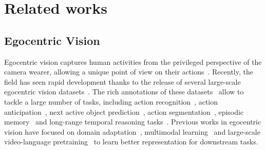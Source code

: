 \section{Related works}\label{sec:related_works}

\subsection{Egocentric Vision}
Egocentric vision captures human activities from the privileged perspective of the camera wearer, allowing a unique point of view on their actions~\cite{betancourt2015evolution,plizzari2024outlook}.
Recently, the field has seen rapid development thanks to the release of several large-scale egocentric vision datasets~\cite{ek55,egtea,epic_tent,ek100,ego4d,sener2022assembly101}.
The rich annotations of these datasets~\cite{ek100,ego4d} allow to tackle a large number of tasks, including action recognition~\cite{nunez2022egocentric}, action anticipation~\cite{furnari2020rulstm,girdhar2021anticipative,zhong2023anticipative}, next active object prediction~\cite{furnari2017next}, action segmentation~\cite{zhang2022actionformer,huang2020improving}, episodic memory~\cite{ramakrishnan2023spotem} and long-range temporal reasoning tasks~\cite{goletto2025amego,mangalam2023egoschema,jia2022egotaskqa}.
Previous works in egocentric vision have focused on domain adaptation~\cite{Munro_2020_CVPR,yang2022interact,chen2019temporal,plizzari2023can,planamente2024relative}, multimodal learning~\cite{zehua2033human,gao2020listen, yang2022interact} and large-scale video-language pretraining~\cite{lin2022egocentric,pramanick2023egovlpv2,hiervl,zhao2023learning} to learn better representation for downstream tasks.

